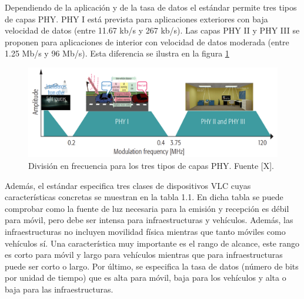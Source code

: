 Dependiendo de la aplicación y de la tasa de datos el estándar permite tres tipos de 
capas PHY. PHY I está prevista para aplicaciones exteriores con baja velocidad de 
datos (entre 11.67 kb/s y 267 kb/s). Las capas PHY II y PHY III se proponen para 
aplicaciones de interior con velocidad de datos moderada (entre 1.25 Mb/s y 96 Mb/s).
Esta diferencia se ilustra en la figura \ref{capasPHY}

\begin{figure}[ht]
    \centering
    \includegraphics[scale=0.35]{./figuras/capasEstandar.png}
    \caption{\small{División en frecuencia para los tres tipos de capas PHY. Fuente [X].}}
    \label{capasPHY}%
\end{figure}

Además, el estándar especifica tres clases de dispositivos VLC cuyas características 
concretas se muestran en la tabla 1.1. En dicha tabla se puede comprobar como la fuente de 
luz necesaria para la emisión y recepción es débil para móvil, pero debe ser intensa para 
infraestructuras y vehículos. Además, las infraestructuras no incluyen movilidad física 
mientras que tanto móviles como vehículos sí. Una característica muy importante es el 
rango de alcance, este rango es corto para móvil y largo para vehículos mientras que 
para infraestructuras puede ser corto o largo. Por último, se especifica la tasa de datos
(número de bits por unidad de tiempo) que es alta para móvil, baja para los vehículos y 
alta o baja para las infraestructuras.

